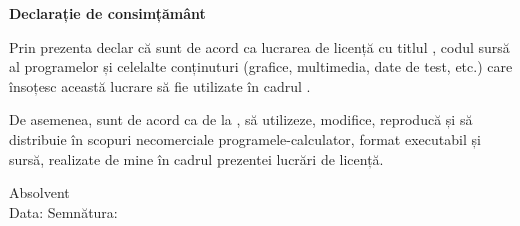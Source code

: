 \vspace*{\fill}
\begin{center}
    \large
    \textbf{Declarație de consimțământ}
\end{center}

Prin prezenta declar că sunt de acord ca lucrarea de licență cu titlul \textbf{\thesistitle}, codul sursă al programelor și celelalte 
conținuturi (grafice, multimedia, date de test, etc.) care însoțesc această lucrare să fie utilizate în cadrul \facultyg.

De asemenea, sunt de acord ca \faculty \space de la \university, să utilizeze, modifice, reproducă și să distribuie în scopuri 
necomerciale programele-calculator, format executabil și sursă, realizate de mine în cadrul prezentei lucrări de licență.

\begin{flushright}
    Absolvent \textbf{\authornamefl} \\
    \vspace{0.5cm}
    Data: \dottedline \hspace{6cm} Semnătura: \dottedline
\end{flushright}
\vspace*{\fill}
\pagebreak
